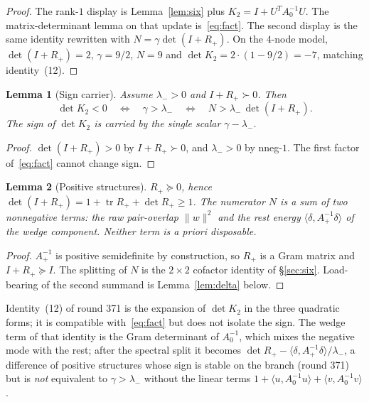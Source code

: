 \documentclass[11pt]{article}
\newtheorem{lemma}{Lemma}
\theoremstyle{remark}
\newcommand{\lam}{\lambda_{-}}
\newcommand{\Rp}{R_{+}}
\newcommand{\Ap}{A_{+}}
\begin{document}
\begin{proof}
The rank-$1$ display is Lemma~\ref{lem:six} plus $K_{2}=I+U^{T}A_{0}^{-1}U$.
The matrix-determinant lemma on that update is~\eqref{eq:fact}.
The second display is the same identity rewritten with $N=\gamma\det(I+\Rp)$.
On the $4$-node model, $\det(I+\Rp)=2$, $\gamma=9/2$, $N=9$ and
$\det K_{2}=2\cdot(1-9/2)=-7$, matching identity~(12).
\end{proof}

\begin{lemma}[Sign carrier]\label{lem:sign}
Assume $\lam>0$ and $I+\Rp\succ 0$.  Then
\[
\det K_{2}<0
\quad\Longleftrightarrow\quad
\gamma>\lam
\quad\Longleftrightarrow\quad
N>\lam\,\det(I+\Rp).
\]
The sign of $\det K_{2}$ is carried by the single scalar
$\gamma-\lam$.
\end{lemma}

\begin{proof}
$\det(I+\Rp)>0$ by $I+\Rp\succ 0$, and $\lam>0$ by nneg-$1$.
The first factor of~\eqref{eq:fact} cannot change sign.
\end{proof}

\begin{lemma}[Positive structures]\label{lem:pos}
$\Rp\succeq 0$, hence $\det(I+\Rp)=1+\operatorname{tr}\Rp+\det\Rp\ge 1$.
The numerator $N$ is a sum of two nonnegative terms: the raw
pair-overlap $\|w\|^{2}$ and the rest energy
$\langle\delta,\Ap^{-1}\delta\rangle$ of the wedge component.
Neither term is a priori disposable.
\end{lemma}

\begin{proof}
$\Ap^{-1}$ is positive semidefinite by construction, so $\Rp$ is a
Gram matrix and $I+\Rp\succeq I$.  The splitting of $N$ is the
$2\times2$ cofactor identity of \S\ref{sec:six}.  Load-bearing of
the second summand is Lemma~\ref{lem:delta} below.
\end{proof}

Identity~(12) of round 371 is the expansion of $\det K_{2}$ in the
three quadratic forms; it is compatible with~\eqref{eq:fact} but
does not isolate the sign.  The wedge term of that identity is
the Gram determinant of $A_{0}^{-1}$, which mixes the negative
mode with the rest; after the spectral split it becomes
$\det\Rp-\langle\delta,\Ap^{-1}\delta\rangle/\lam$, a difference of
positive structures whose sign is stable on the branch (round 371)
but is \emph{not} equivalent to $\gamma>\lam$ without the linear
terms $1+\langle u,A_{0}^{-1}u\rangle+\langle v,A_{0}^{-1}v\rangle$.
\end{document}
